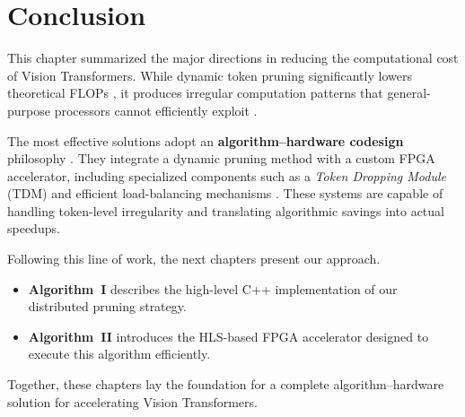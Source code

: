\section{Conclusion}

This chapter summarized the major directions in reducing the computational cost of Vision Transformers. While dynamic token pruning significantly lowers theoretical FLOPs \cite{ref2}, it produces irregular computation patterns that general-purpose processors cannot efficiently exploit \cite{ref3}.

The most effective solutions adopt an \textbf{algorithm–hardware codesign} philosophy \cite{ref11}. They integrate a dynamic pruning method with a custom FPGA accelerator, including specialized components such as a \textit{Token Dropping Module} (TDM) and efficient load-balancing mechanisms \cite{ref3, ref4}. These systems are capable of handling token-level irregularity and translating algorithmic savings into actual speedups.

Following this line of work, the next chapters present our approach. 
\begin{itemize}
    \item \textbf{Algorithm~I} describes the high-level C++ implementation of our distributed pruning strategy.
    \item \textbf{Algorithm~II} introduces the HLS-based FPGA accelerator designed to execute this algorithm efficiently.
\end{itemize}

Together, these chapters lay the foundation for a complete algorithm–hardware solution for accelerating Vision Transformers.
